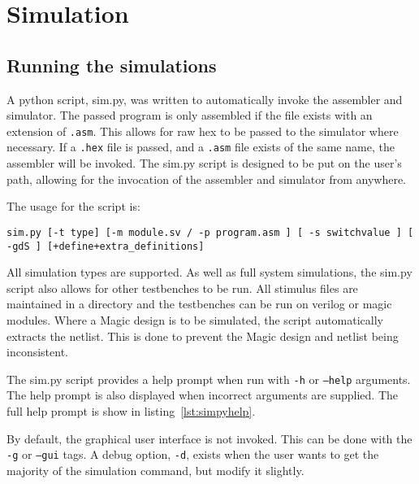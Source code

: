 
\section{Simulation}

\subsection{Running the simulations}



A python script, sim.py, was written to automatically invoke the assembler and simulator. 
The passed program is only assembled if the file exists with an extension of \texttt{.asm}. 
This allows for raw hex to be passed to the simulator where necessary. 
If a \texttt{.hex} file is passed, and a \texttt{.asm} file exists of the same name, the assembler will be invoked. 
The sim.py script is designed to be put on the user's path, allowing for the invocation of the assembler and simulator from anywhere. 

The usage for the script is:
\begin{center}
\texttt{sim.py [-t type] [-m module.sv / -p program.asm ] [ -s switchvalue ] [ -gdS ] [+define+extra\_definitions]}
\end{center}

All simulation types are supported. 
As well as full system simulations, the sim.py script also allows for other testbenches to be run.
All stimulus files are maintained in a directory and the testbenches can be run on verilog or magic modules. 
Where a Magic design is to be simulated, the script automatically extracts the netlist. 
This is done to prevent the Magic design and netlist being inconsistent. 

The sim.py script provides a help prompt when run with \texttt{-h} or \texttt{--help} arguments. 
The help prompt is also displayed when incorrect arguments are supplied. 
The full help prompt is show in listing~\ref{lst:simpyhelp}. 

By default, the graphical user interface is not invoked. 
This can be done with the \texttt{-g} or \texttt{--gui} tags. 
A debug option, \texttt{-d}, exists when the user wants to get the majority of the simulation command, but modify it slightly. 

